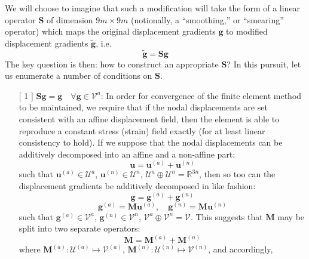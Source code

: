 \documentclass[12pt]{article}
\begin{document}
We will choose to imagine that such a modification will take the form of a linear operator $\mathbf{S}$ of dimension $9m \times 9m$ (notionally, a ``smoothing,'' or ``smearing'' operator) which maps the original displacement gradients $\mathbf{g}$ to modified displacement gradients $\tilde{\mathbf{g}}$, i.e.
\begin{equation}
        \tilde{\mathbf{g}} = \mathbf{S} \mathbf{g}
\end{equation}
The key question is then: how to construct an appropriate $\mathbf{S}$? In this pursuit, let us enumerate a number of conditions on $\mathbf{S}$.
\begin{itemize}
        \item[[ 1]] $\mathbf{S} \mathbf{g} = \mathbf{g} \quad \forall \mathbf{g} \in \mathcal{V}^{a}$: In order for convergence of the finite element method to be maintained, we require that if the nodal displacements are set consistent with an affine displacement field, then the element is able to reproduce a constant stress (strain) field exactly (for at least linear consistency to hold). If we suppose that the nodal displacements can be additively decomposed into an affine and a non-affine part:
        \begin{equation}
                \mathbf{u} = \mathbf{u}^{(a)} + \mathbf{u}^{(n)}
        \end{equation}
        such that $\mathbf{u}^{(a)} \in \mathcal{U}^{a}$, $\mathbf{u}^{(n)} \in \mathcal{U}^{n}$, $\mathcal{U}^{a} \oplus \mathcal{U}^{n} = \mathbb{R}^{3n}$, then so too can the displacement gradients be additively decomposed in like fashion:
        \begin{equation}
                \mathbf{g} = \mathbf{g}^{(a)} + \mathbf{g}^{(n)}
        \end{equation}
        \begin{equation}
                \mathbf{g}^{(a)} = \mathbf{M} \mathbf{u}^{(a)}, \quad \mathbf{g}^{(n)} = \mathbf{M} \mathbf{u}^{(n)}
        \end{equation}
        such that $\mathbf{g}^{(a)} \in \mathcal{V}^{a}$, $\mathbf{g}^{(n)} \in \mathcal{V}^{n}$, $\mathcal{V}^{a} \oplus \mathcal{V}^{n} = \mathcal{V}$. This suggests that $\mathbf{M}$ may be split into two separate operators:
        \begin{equation}
                \mathbf{M} = \mathbf{M}^{(a)} + \mathbf{M}^{(n)}
        \end{equation}
        where $\mathbf{M}^{(a)} \colon \mathcal{U}^{(a)} \mapsto \mathcal{V}^{(a)}$, $\mathbf{M}^{(n)} \colon \mathcal{U}^{(n)} \mapsto \mathcal{V}^{(n)}$, and accordingly,

\end{itemize}
\end{document}
